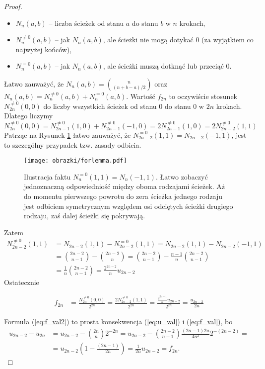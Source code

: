 \documentclass[a4paper,11pt,twoside]{book}
\theoremstyle{definition}
\begin{document}
\begin{proof}
\begin{itemize}
  \setlength\itemsep{1pt}
  \item $N_n(a,b)$ -- liczba ścieżek od stanu $a$ do stanu $b$ w $n$ krokach,
  \item $N_n^{\neq 0}(a,b)$ -- jak $N_n(a,b)$, ale ścieżki nie mogą dotykać 0 (za wyjątkiem co najwyżej końców),
  \item $N_n^{=0}(a,b)$ -- jak $N_n(a,b)$, ale ścieżki muszą dotknąć lub przeciąć 0.
\end{itemize}
Łatwo zauważyć, że $N_n(a,b) = \binom{n}{(n+b-a)/2}$ oraz $N_n(a,b) = N_n^{\neq 0}(a,b) + N_n^{= 0}(a,b)$. Wartość $f_{2n}$ to oczywiście stosunek $N_{2n}^{\neq 0}(0,0)$ do liczby wszystkich ścieżek od stanu 0 do stanu 0 w $2n$ krokach. Dlatego liczymy
\[ N_{2n}^{\neq 0}(0,0) = N_{2n-1}^{\neq 0}(1,0) + N_{2n-1}^{\neq 0}(-1,0) = 2N_{2n-1}^{\neq 0}(1,0)= 2N_{2n-2}^{\neq 0}(1,1) \]
Patrząc na Rysunek \ref{fig:forlemma} łatwo zauważyć, że $N_{2n-2}^{=0}(1,1) = N_{2n-2}(-1,1)$, jest to szczególny przypadek tzw. zasady odbicia.
\begin{figure}[h]
 \centering
 \texttt{[image: obrazki/forlemma.pdf]}
 \caption{Ilustracja faktu $N_n^{=0}(1,1) = N_n(-1,1)$. Łatwo zobaczyć jednoznaczną odpowiedniość między oboma rodzajami ścieżek. Aż do momentu pierwszego powrotu do zera ścieżka jednego rodzaju jest odbiciem symetrycznym względem osi odciętych ścieżki drugiego rodzaju, zaś dalej ścieżki się pokrywają.}
 \label{fig:forlemma}
\end{figure}
Zatem
\begin{equation*}
 \begin{split}
   N_{2n-2}^{\neq 0}(1,1)
   &= N_{2n-2}(1,1) - N_{2n-2}^{=0}(1,1) =  N_{2n-2}(1,1) - N_{2n-2}(-1,1) \\
   &= \binom{2n-2}{n-1} - \binom{2n-2}{n} = \binom{2n-2}{n-1} - \frac{n-1}{n}\binom{2n-2}{n-1} \\
   &= \frac{1}{n} \binom{2n-2}{n-1} = \frac{2^{2n-2}}{n} u_{2n-2}
 \end{split}
\end{equation*}
Ostatecznie

\begin{equation*}
 \begin{split}
   f_{2n} &= \frac{N_{2n}^{\neq 0}(0,0)}{2^{2n}} = \frac{2N_{2n-2}^{\neq 0}(1,1)}{2^{2n}} = \frac{\frac{2^{2n-1}}{n} u_{2n-2}}{2^{2n}} = \frac{u_{2n-2}}{2n}
 \end{split}
\end{equation*}

 Formuła (\ref{eq:f_val2}) to prosta konsekwencja (\ref{eq:u_val}) i (\ref{eq:f_val}), bo
 \begin{equation*}
 \begin{split}
    u_{2n-2} - u_{2n} &= u_{2n-2} - \binom{2n}{n}2^{-2n} =  u_{2n-2} - \binom{2n-2}{n-1} \frac{(2n-1)2n}{4n^2}2^{-(2n-2)} = \\
    &= u_{2n-2}\left(1 - \frac{(2n-1)}{2n} \right) = \frac{1}{2n} u_{2n-2} =  f_{2n}.
 \end{split}
 \end{equation*}
\end{proof}
\end{document}

